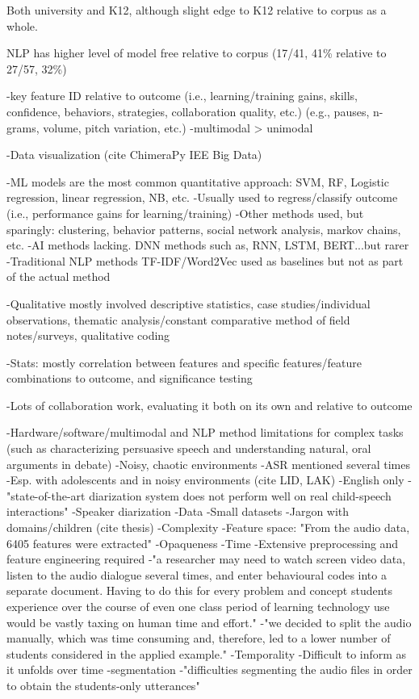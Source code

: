 \documentclass[manuscript,screen,review]{acmart}
\begin{document}
Both university and K12, although slight edge to K12 relative to corpus as a whole.

NLP has higher level of model free relative to corpus (17/41, 41\% relative to 27/57, 32\%)

    -key feature ID relative to outcome (i.e., learning/training gains, skills, confidence, behaviors, strategies, collaboration quality, etc.) (e.g., pauses, n-grams, volume, pitch variation, etc.)
    -multimodal > unimodal


-Data visualization (cite ChimeraPy IEE Big Data) 

-ML models are the most common quantitative approach: SVM, RF, Logistic regression, linear regression, NB, etc.
    -Usually used to regress/classify outcome (i.e., performance gains for learning/training)
    -Other methods used, but sparingly: clustering, behavior patterns, social network analysis, markov chains, etc.
    -AI methods lacking. DNN methods such as, RNN, LSTM, BERT...but rarer
    -Traditional NLP methods TF-IDF/Word2Vec used as baselines but not as part of the actual method

-Qualitative mostly involved descriptive statistics, case studies/individual observations, thematic analysis/constant comparative method of field notes/surveys, qualitative coding

-Stats: mostly correlation between features and specific features/feature combinations to outcome, and significance testing

-Lots of collaboration work, evaluating it both on its own and relative to outcome

-Hardware/software/multimodal and NLP method limitations for complex tasks (such as characterizing persuasive speech and understanding natural, oral arguments in debate)
    -Noisy, chaotic environments
    -ASR mentioned several times
        -Esp. with adolescents and in noisy environments (cite LID, LAK)
        -English only
        -"state-of-the-art diarization system does not perform well on real child-speech interactions"
    -Speaker diarization
-Data
    -Small datasets 
    -Jargon with domains/children (cite thesis)
-Complexity
    -Feature space: "From the audio data, 6405 features were extracted"
-Opaqueness
-Time   
    -Extensive preprocessing and feature engineering required
    -"a researcher may need to watch screen video data, listen to the audio dialogue several times, and enter behavioural codes into a separate document. Having to do this for every problem and concept students experience over the course of even one class period of learning technology use would be vastly taxing on human time and effort."
    -"we decided to split the audio manually, which was time consuming and, therefore, led to a lower number of students considered in the applied example."
-Temporality
    -Difficult to inform as it unfolds over time
    -segmentation
        -"difficulties segmenting the audio files in order to obtain the students-only utterances"
        
\end{document}
